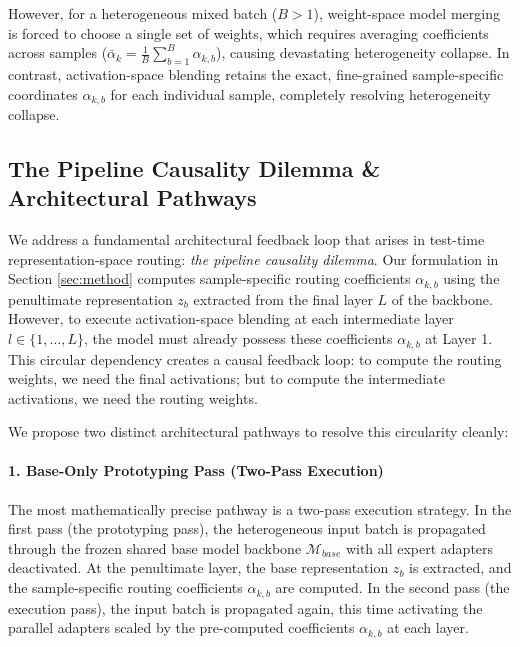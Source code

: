 However, for a heterogeneous mixed batch ($B > 1$), weight-space model merging is forced to choose a single set of weights, which requires averaging coefficients across samples ($\bar{\alpha}_k = \frac{1}{B} \sum_{b=1}^B \alpha_{k, b}$), causing devastating heterogeneity collapse. In contrast, activation-space blending retains the exact, fine-grained sample-specific coordinates $\alpha_{k, b}$ for each individual sample, completely resolving heterogeneity collapse.

\subsection{The Pipeline Causality Dilemma \& Architectural Pathways}
\label{sec:causality}

We address a fundamental architectural feedback loop that arises in test-time representation-space routing: \emph{the pipeline causality dilemma}. Our formulation in Section \ref{sec:method} computes sample-specific routing coefficients $\alpha_{k, b}$ using the penultimate representation $z_b$ extracted from the final layer $L$ of the backbone. However, to execute activation-space blending at each intermediate layer $l \in \{1, \dots, L\}$, the model must already possess these coefficients $\alpha_{k, b}$ at Layer 1. This circular dependency creates a causal feedback loop: to compute the routing weights, we need the final activations; but to compute the intermediate activations, we need the routing weights.

We propose two distinct architectural pathways to resolve this circularity cleanly:

\paragraph{1. Base-Only Prototyping Pass (Two-Pass Execution)}
The most mathematically precise pathway is a two-pass execution strategy. In the first pass (the prototyping pass), the heterogeneous input batch is propagated through the frozen shared base model backbone $\mathcal{M}_{base}$ with all expert adapters deactivated. At the penultimate layer, the base representation $z_b$ is extracted, and the sample-specific routing coefficients $\alpha_{k, b}$ are computed. In the second pass (the execution pass), the input batch is propagated again, this time activating the parallel adapters scaled by the pre-computed coefficients $\alpha_{k,b}$ at each layer. 

